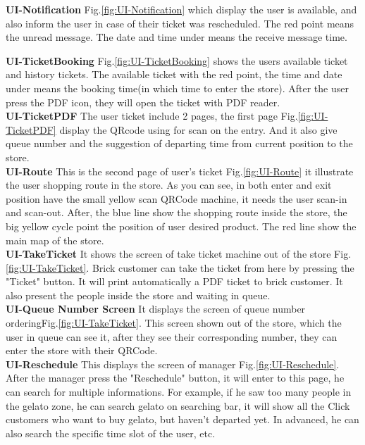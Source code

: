 \documentclass[a4paper,12pt]{report}
\begin{document}
\textbf{UI-Notification}  Fig.\ref{fig:UI-Notification} which display the user is available, and also inform the user in case of their ticket was rescheduled. The red point means the unread message. The date and time under means the receive message time.

\textbf{UI-TicketBooking}  Fig.\ref{fig:UI-TicketBooking} shows the users available ticket and history tickets. The available ticket with the red point, the time and date under means the booking time(in which time to enter the store). After the user press the PDF icon, they will open the ticket with PDF reader.~\\

\textbf{UI-TicketPDF} The user ticket include 2 pages, the first page Fig.\ref{fig:UI-TicketPDF} display the QRcode using for scan on the entry. And it also give queue number and the suggestion of departing time from current position to the store.~\\

\textbf{UI-Route} This is the second page of user's ticket Fig.\ref{fig:UI-Route} it illustrate the user shopping route in the store. As you can see, in both enter and exit position have the small yellow scan QRCode machine, it needs the user scan-in and scan-out. After, the blue line show the shopping route inside the store, the big yellow cycle point the position of user desired product. The red line show the main map of the store.~\\
 
\textbf{UI-TakeTicket} It shows the screen of take ticket machine out of the store Fig.\ref{fig:UI-TakeTicket}. Brick customer can take the ticket from here by pressing the "Ticket" button. It will print automatically a PDF ticket to brick customer. It also present the people inside the store and waiting in queue.~\\

\textbf{UI-Queue Number Screen} It displays the screen of queue number orderingFig.\ref{fig:UI-TakeTicket}. This screen shown out of the store, which the user in queue can see it, after they see their corresponding number, they can enter the store with their QRCode.~\\

\textbf{UI-Reschedule} This displays the screen of manager Fig.\ref{fig:UI-Reschedule}. After the manager press the "Reschedule" button, it will enter to this page, he can search for multiple informations. For example, if he saw too many people in the gelato zone, he can search gelato on searching bar, it will show all the Click customers who want to buy gelato, but haven't departed yet. In advanced, he can also search the specific time slot of the user, etc. ~\\  
\end{document}
